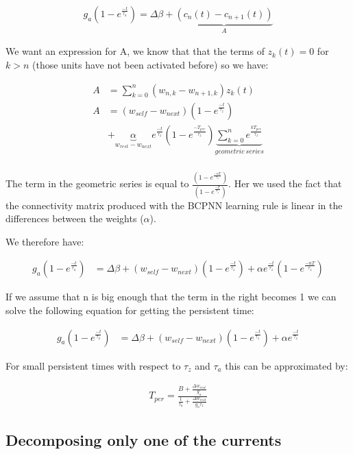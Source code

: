 \documentclass[10pt,a4paper]{article}
\begin{document}
\begin{align*}
g_a ( 1 - e^{\frac{-t}{\tau_a}})  = \Delta \beta  + \underbrace{(c_n(t) - c_{n + 1}(t))}_{A} 
\end{align*}

We want an expression for A, we know that that the terms of $z_k(t) = 0$ for $k > n$ (those units have not been activated before) so we have:

\begin{align*}
A &= \sum\limits_{k=0}^{n} (w_{n, k} - w_{n + 1, k})z_k(t) \\
A &= (w_{self} - w_{next})( 1 - e^{\frac{-t}{\tau_z}}) \\
 &+ \underbrace{\alpha}_{w_{rest} - w_{next}} e^{\frac{-t}{\tau_z}}(1 - e^{\frac{-T_{per}}{\tau_z}}) \underbrace{\sum\limits_{k=0}^{n}e^{\frac{kT_{per}}{\tau_z}}}_{geometric \: series} \\
\end{align*}

The term in the geometric series is equal to $\frac{(1 - e^{\frac{-nT}{\tau_z}})}{(1 - e^{\frac{-T}{\tau_z}})}$. Her we used the fact that the connectivity matrix produced with the BCPNN learning rule is linear in the differences between the weights ($\alpha$). 

We therefore have:

\begin{align*}
g_a ( 1 - e^{\frac{-t}{\tau_a}}) &= \Delta \beta  + (w_{self} - w_{next})( 1 - e^{\frac{-t}{\tau_z}}) + \alpha e^{\frac{-t}{\tau_z}} (1 - e^{\frac{-nT}{\tau_z}})
\end{align*}

If we assume that n is big enough that the term in the right becomes 1 we can solve the following equation for getting the persistent time:

\begin{align*}
g_a ( 1 - e^{\frac{-t}{\tau_a}}) &= \Delta \beta  + (w_{self} - w_{next})( 1 - e^{\frac{-t}{\tau_z}}) +   \alpha e^{\frac{-t}{\tau_z}} 
\end{align*}

For small persistent times with respect to $\tau_z$ and $\tau_a$ this can be approximated by:

\begin{align*}
T_{per} = \frac{B + \frac{\Delta w_{rest}}{g_a}}{\frac{1}{\tau_a} + \frac{\Delta w_{rest}}{g_a \tau_z}}
\end{align*}

\subsection*{Decomposing only one of the currents}
\end{document}
